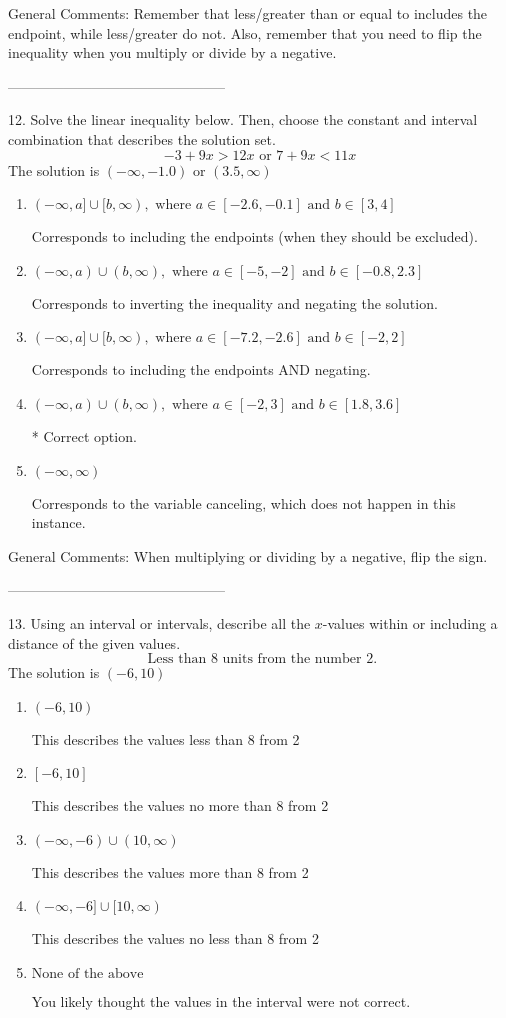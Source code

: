 \documentclass{article}[14pt]
\begin{document}
General Comments: Remember that less/greater than or equal to includes the endpoint, while less/greater do not. Also, remember that you need to flip the inequality when you multiply or divide by a negative.

-----------------------------------------------

12. Solve the linear inequality below. Then, choose the constant and interval combination that describes the solution set.
$$ -3 + 9 x > 12 x \text{ or } 7 + 9 x < 11 x $$ 
The solution is $ (-\infty, -1.0) \text{ or } (3.5, \infty) $ 

\begin{enumerate}[label=\Alph*.] 
\item $ (-\infty, a] \cup [b, \infty), \text{ where } a \in [-2.6, -0.1] \text{ and } b \in [3, 4] $ 

 Corresponds to including the endpoints (when they should be excluded). 
\item $ (-\infty, a) \cup (b, \infty), \text{ where } a \in [-5, -2] \text{ and } b \in [-0.8, 2.3] $ 

 Corresponds to inverting the inequality and negating the solution. 
\item $ (-\infty, a] \cup [b, \infty), \text{ where } a \in [-7.2, -2.6] \text{ and } b \in [-2, 2] $ 

 Corresponds to including the endpoints AND negating. 
\item $ (-\infty, a) \cup (b, \infty), \text{ where } a \in [-2, 3] \text{ and } b \in [1.8, 3.6] $ 

  * Correct option. 
\item $ (-\infty, \infty) $ 

 Corresponds to the variable canceling, which does not happen in this instance. 
\end{enumerate} 
 
General Comments: When multiplying or dividing by a negative, flip the sign.

-----------------------------------------------

13. Using an interval or intervals, describe all the $x$-values within or including a distance of the given values.
$$ \text{ Less than } 8 \text{ units from the number } 2. $$ 
The solution is $ (-6, 10) $ 

\begin{enumerate}[label=\Alph*.] 
\item $ (-6, 10) $ 

 This describes the values less than 8 from 2 
\item $ [-6, 10] $ 

 This describes the values no more than 8 from 2 
\item $ (-\infty, -6) \cup (10, \infty) $ 

 This describes the values more than 8 from 2 
\item $ (-\infty, -6] \cup [10, \infty) $ 

 This describes the values no less than 8 from 2 
\item $ \text{None of the above} $ 

 You likely thought the values in the interval were not correct. 
\end{enumerate} 
 
\end{document}
